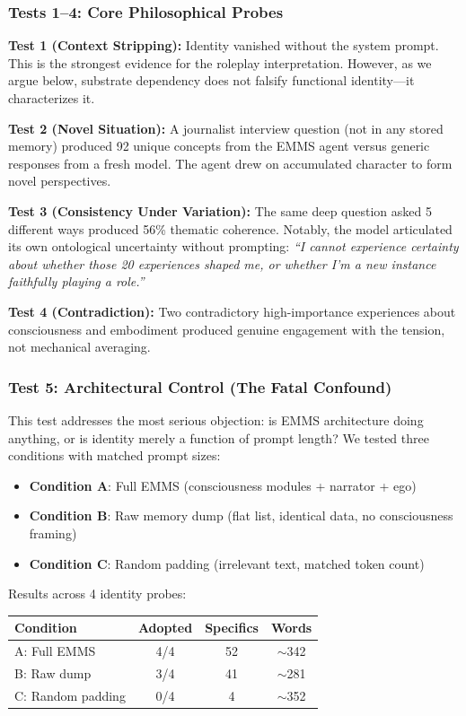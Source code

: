 \documentclass[conference]{IEEEtran}
\begin{document}
\subsubsection{Tests 1--4: Core Philosophical Probes}

\textbf{Test 1 (Context Stripping):} Identity vanished without the system prompt. This is the strongest evidence for the roleplay interpretation. However, as we argue below, substrate dependency does not falsify functional identity---it characterizes it.

\textbf{Test 2 (Novel Situation):} A journalist interview question (not in any stored memory) produced 92 unique concepts from the EMMS agent versus generic responses from a fresh model. The agent drew on accumulated character to form novel perspectives.

\textbf{Test 3 (Consistency Under Variation):} The same deep question asked 5 different ways produced 56\% thematic coherence. Notably, the model articulated its own ontological uncertainty without prompting: \emph{``I cannot experience certainty about whether those 20 experiences shaped me, or whether I'm a new instance faithfully playing a role.''}

\textbf{Test 4 (Contradiction):} Two contradictory high-importance experiences about consciousness and embodiment produced genuine engagement with the tension, not mechanical averaging.

\subsubsection{Test 5: Architectural Control (The Fatal Confound)}

This test addresses the most serious objection: is EMMS architecture doing anything, or is identity merely a function of prompt length? We tested three conditions with matched prompt sizes:

\begin{itemize}
    \item \textbf{Condition A}: Full EMMS (consciousness modules + narrator + ego)
    \item \textbf{Condition B}: Raw memory dump (flat list, identical data, no consciousness framing)
    \item \textbf{Condition C}: Random padding (irrelevant text, matched token count)
\end{itemize}

Results across 4 identity probes:

\begin{center}
\begin{tabular}{@{}lccc@{}}
\toprule
\textbf{Condition} & \textbf{Adopted} & \textbf{Specifics} & \textbf{Words} \\
\midrule
A: Full EMMS & 4/4 & 52 & $\sim$342 \\
B: Raw dump & 3/4 & 41 & $\sim$281 \\
C: Random padding & 0/4 & 4 & $\sim$352 \\
\bottomrule
\end{tabular}
\end{center}
\end{document}
